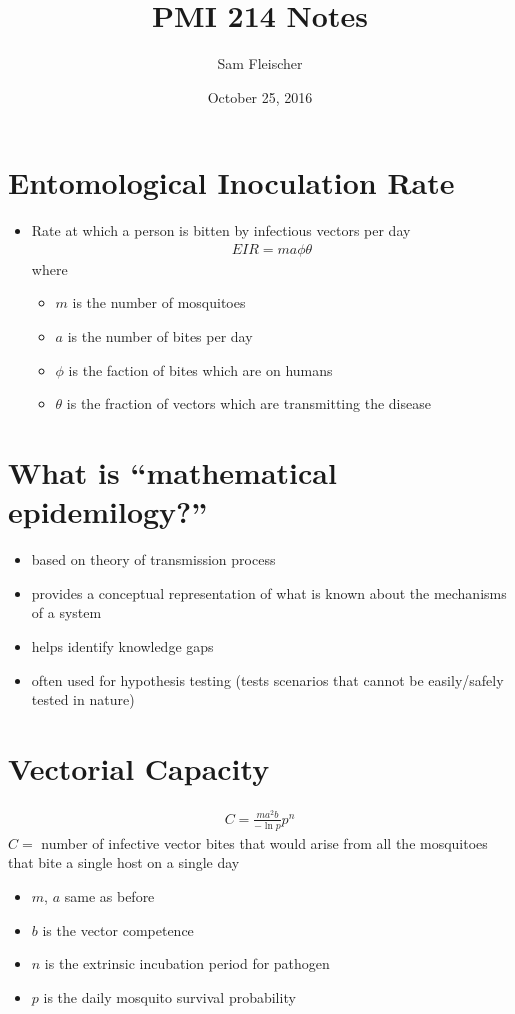 \documentclass{article}
\title{PMI 214 Notes}
\author{Sam Fleischer}
\date{October 25, 2016}
\begin{document}
    \maketitle

    \section{Entomological Inoculation Rate}
        \begin{itemize}
            \item Rate at which a person is bitten by infectious vectors per day
            \begin{align}
                EIR = ma\phi\theta
            \end{align}
            where
            \begin{itemize}
                \item $m$ is the number of mosquitoes
                \item $a$ is the number of bites per day
                \item $\phi$ is the faction of bites which are on humans
                \item $\theta$ is the fraction of vectors which are transmitting the disease
            \end{itemize}
        \end{itemize}
    \section{What is ``mathematical epidemilogy?''}
        \begin{itemize}
            \item based on theory of transmission process
            \item provides a conceptual representation of what is known about the mechanisms of a system
            \item helps identify knowledge gaps
            \item often used for hypothesis testing (tests scenarios that cannot be easily/safely tested in nature)
        \end{itemize}

    \section{Vectorial Capacity}
        \begin{align}
            C = \frac{ma^2b}{-\ln p}p^n
        \end{align}
        $C = $ number of infective vector bites that would arise from all the mosquitoes that bite a single host on a single day
        \begin{itemize}
            \item $m$, $a$ same as before
            \item $b$ is the vector competence
            \item $n$ is the extrinsic incubation period for pathogen
            \item $p$ is the daily mosquito survival probability
        \end{itemize}
\end{document}
